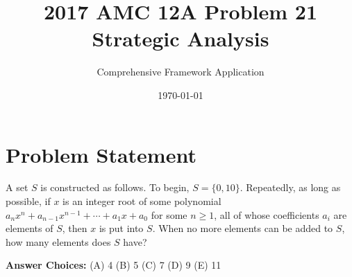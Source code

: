 \documentclass[12pt]{article}
\title{\textbf{2017 AMC 12A Problem 21\\Strategic Analysis}}
\author{Comprehensive Framework Application}
\date{\today}
\begin{document}
\maketitle

\section*{Problem Statement}

A set $S$ is constructed as follows. To begin, $S = \{0,10\}$. Repeatedly, as long as possible, if $x$ is an integer root of some polynomial $a_{n}x^n + a_{n-1}x^{n-1} + \cdots + a_{1}x + a_0$ for some $n\geq{1}$, all of whose coefficients $a_i$ are elements of $S$, then $x$ is put into $S$. When no more elements can be added to $S$, how many elements does $S$ have?

\textbf{Answer Choices:} (A) 4 \quad (B) 5 \quad (C) 7 \quad (D) 9 \quad (E) 11

\vspace{0.5cm}
\end{document}
